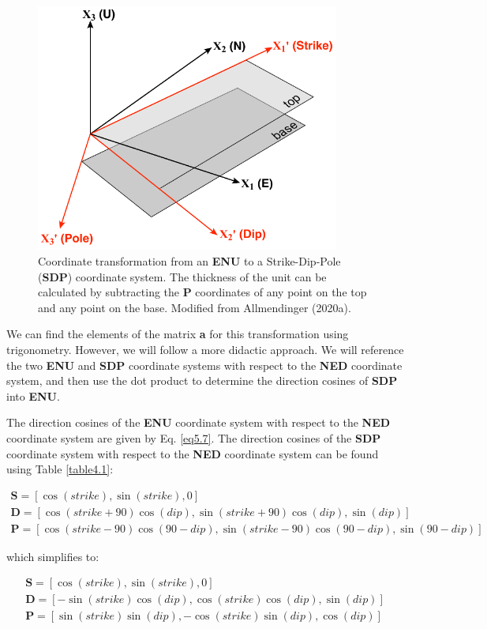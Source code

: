 \documentclass[a4paper , 12pt]{book}
\begin{document}
 \begin{figure}[ht]
    \centering
    \includegraphics[width=10cm]{ch5f3.pdf}
    \caption{Coordinate transformation from an \textbf{ENU} to a Strike-Dip-Pole (\textbf{SDP}) coordinate system. The thickness of the unit can be calculated by subtracting the \textbf{P} coordinates of any point on the top and any point on the base. Modified from Allmendinger (2020a).}
\end{figure}

We can find the elements of the matrix \textbf{a} for this transformation using trigonometry. However, we will follow a more didactic approach. We will reference the two \textbf{ENU} and \textbf{SDP} coordinate systems with respect to the \textbf{NED} coordinate system, and then use the dot product to determine the direction cosines of \textbf{SDP} into \textbf{ENU}. 

The direction cosines of the \textbf{ENU} coordinate system with respect to the \textbf{NED} coordinate system are given by Eq. \ref{eq5.7}. The direction cosines of the \textbf{SDP} coordinate system with respect to the \textbf{NED} coordinate system can be found using Table \ref{table4.1}:

\begin{gather*}
    \mathbf{S} = [\cos(strike),\sin(strike),0] \\
    \mathbf{D} = [\cos(strike+90)\cos(dip),\sin(strike+90)\cos(dip),\sin(dip)] \\
    \mathbf{P} = [\cos(strike-90)\cos(90-dip),\sin(strike-90)\cos(90-dip),\sin(90-dip)]
\end{gather*}

which simplifies to:

\begin{equation}
    \begin{gathered}
        \mathbf{S} = [\cos(strike),\sin(strike),0]  \\
        \mathbf{D} = [-\sin(strike)\cos(dip),\cos(strike)\cos(dip),\sin(dip)] \\
        \mathbf{P} = [\sin(strike)\sin(dip),-\cos(strike)\sin(dip),\cos(dip)]
    \end{gathered}
\end{equation}
\end{document}
